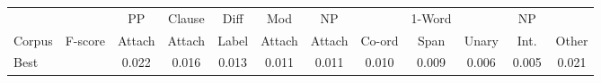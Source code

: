 \begin{table*}
\small
\renewcommand{\tabcolsep}{1.6mm}
\begin{center}
\begin{tabular}{lccccccccccc}
	\hline
		&
		&
		PP &
		Clause &
		Diff &
		Mod &
		NP &
		&
		1-Word &
		&
		NP &
		\\
		Corpus &
		F-score &
		Attach &
		Attach &
		Label &
		Attach &
		Attach &
		Co-ord &
		Span &
		Unary &
		\textcolor{white}{a}Int.\textcolor{white}{a} &
		Other \\
	\hline
	\hline
Best &  & 0.022 & 0.016 & 0.013 & 0.011 & 0.011 & 0.010 & 0.009 & 0.006 & 0.005 & 0.021 \\

\end{tabular}
\end{center}
\end{table*}

